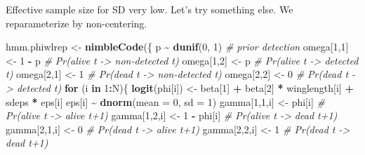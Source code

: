 \documentclass[
  12pt,
]{krantz}
\newenvironment{Shaded}{\begin{snugshade}}{\end{snugshade}}
\newcommand{\AttributeTok}[1]{\textcolor[rgb]{0.13,0.29,0.53}{#1}}
\newcommand{\CommentTok}[1]{\textcolor[rgb]{0.56,0.35,0.01}{\textit{#1}}}
\newcommand{\ControlFlowTok}[1]{\textcolor[rgb]{0.13,0.29,0.53}{\textbf{#1}}}
\newcommand{\DecValTok}[1]{\textcolor[rgb]{0.00,0.00,0.81}{#1}}
\newcommand{\FunctionTok}[1]{\textcolor[rgb]{0.13,0.29,0.53}{\textbf{#1}}}
\newcommand{\NormalTok}[1]{#1}
\newcommand{\OtherTok}[1]{\textcolor[rgb]{0.56,0.35,0.01}{#1}}
\newcommand{\SpecialCharTok}[1]{\textcolor[rgb]{0.81,0.36,0.00}{\textbf{#1}}}
\begin{document}
Effective sample size for SD very low. Let's try something else. We reparameterize by non-centering.

\begin{Shaded}
\begin{Highlighting}[]
\NormalTok{hmm.phiwlrep }\OtherTok{\textless{}{-}} \FunctionTok{nimbleCode}\NormalTok{(\{}
\NormalTok{    p }\SpecialCharTok{\textasciitilde{}} \FunctionTok{dunif}\NormalTok{(}\DecValTok{0}\NormalTok{, }\DecValTok{1}\NormalTok{) }\CommentTok{\# prior detection}
\NormalTok{    omega[}\DecValTok{1}\NormalTok{,}\DecValTok{1}\NormalTok{] }\OtherTok{\textless{}{-}} \DecValTok{1} \SpecialCharTok{{-}}\NormalTok{ p    }\CommentTok{\# Pr(alive t {-}\textgreater{} non{-}detected t)}
\NormalTok{    omega[}\DecValTok{1}\NormalTok{,}\DecValTok{2}\NormalTok{] }\OtherTok{\textless{}{-}}\NormalTok{ p        }\CommentTok{\# Pr(alive t {-}\textgreater{} detected t)}
\NormalTok{    omega[}\DecValTok{2}\NormalTok{,}\DecValTok{1}\NormalTok{] }\OtherTok{\textless{}{-}} \DecValTok{1}        \CommentTok{\# Pr(dead t {-}\textgreater{} non{-}detected t)}
\NormalTok{    omega[}\DecValTok{2}\NormalTok{,}\DecValTok{2}\NormalTok{] }\OtherTok{\textless{}{-}} \DecValTok{0}        \CommentTok{\# Pr(dead t {-}\textgreater{} detected t)}
  \ControlFlowTok{for}\NormalTok{ (i }\ControlFlowTok{in} \DecValTok{1}\SpecialCharTok{:}\NormalTok{N)\{}
    \FunctionTok{logit}\NormalTok{(phi[i]) }\OtherTok{\textless{}{-}}\NormalTok{ beta[}\DecValTok{1}\NormalTok{] }\SpecialCharTok{+}\NormalTok{ beta[}\DecValTok{2}\NormalTok{] }\SpecialCharTok{*}\NormalTok{ winglength[i] }\SpecialCharTok{+}\NormalTok{ sdeps }\SpecialCharTok{*}\NormalTok{ eps[i]}
\NormalTok{    eps[i] }\SpecialCharTok{\textasciitilde{}} \FunctionTok{dnorm}\NormalTok{(}\AttributeTok{mean =} \DecValTok{0}\NormalTok{, }\AttributeTok{sd =} \DecValTok{1}\NormalTok{)}
\NormalTok{    gamma[}\DecValTok{1}\NormalTok{,}\DecValTok{1}\NormalTok{,i] }\OtherTok{\textless{}{-}}\NormalTok{ phi[i]      }\CommentTok{\# Pr(alive t {-}\textgreater{} alive t+1)}
\NormalTok{    gamma[}\DecValTok{1}\NormalTok{,}\DecValTok{2}\NormalTok{,i] }\OtherTok{\textless{}{-}} \DecValTok{1} \SpecialCharTok{{-}}\NormalTok{ phi[i]  }\CommentTok{\# Pr(alive t {-}\textgreater{} dead t+1)}
\NormalTok{    gamma[}\DecValTok{2}\NormalTok{,}\DecValTok{1}\NormalTok{,i] }\OtherTok{\textless{}{-}} \DecValTok{0}           \CommentTok{\# Pr(dead t {-}\textgreater{} alive t+1)}
\NormalTok{    gamma[}\DecValTok{2}\NormalTok{,}\DecValTok{2}\NormalTok{,i] }\OtherTok{\textless{}{-}} \DecValTok{1}           \CommentTok{\# Pr(dead t {-}\textgreater{} dead t+1)}

\end{Highlighting}
\end{Shaded}
\end{document}
